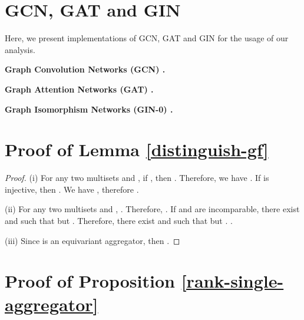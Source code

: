 \documentclass{article} \usepackage{iclr2021_conference,times}
\begin{document}




\clearpage
\appendix

\section{GCN, GAT and GIN}
\label{gcn-gat-gin}

Here, we present implementations of GCN, GAT and GIN for the usage of our analysis.

\textbf{Graph Convolution Networks (GCN) \citep{kipf2016semi}.}


\textbf{Graph Attention Networks (GAT) \citep{velivckovic2017graph}.}



\textbf{Graph Isomorphism Networks (GIN-0) \citep{xu2018how}.}



\section{Proof of Lemma \ref{distinguish-gf}}
\label{proof-distinguish-gf}

\begin{proof}
(i)
For any two multisets  and ,
if ,
then . 
Therefore,
we have .
If  is injective, then .
We have ,
therefore .

(ii)
For any two multisets  and , .
Therefore, .
If  and  are incomparable, there exist  and  such that  but .
Therefore, there exist  and  such that  but .
.

(iii)
Since  is an equivariant aggregator,
then .
\end{proof}

\section{Proof of Proposition \ref{rank-single-aggregator}}
\label{proof-rank-single-aggregator}
\end{document}
